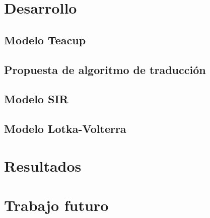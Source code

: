 \documentclass[11pt, a4paper]{article}
\begin{document}

\maketitle
\newpage

\tableofcontents
\newpage

%
% 
\section{Desarrollo}

\subsection{Modelo Teacup}

\subsection{Propuesta de algoritmo de traducción}


\subsection{Modelo SIR}

\subsection{Modelo Lotka-Volterra}


\section{Resultados}


\section{Trabajo futuro}


%
% 
%
\end{document}
